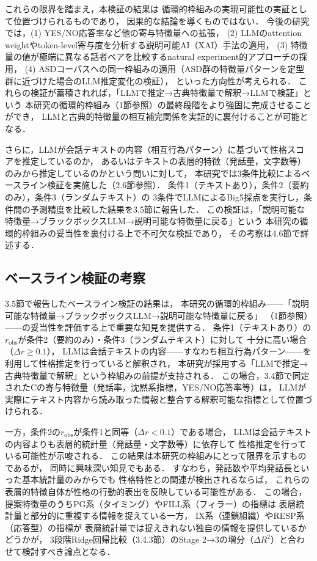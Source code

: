 \documentclass[dvipdfmx,11pt,a4paper]{bxjsarticle}
\renewcommand{\_}{\paperorigunderscore\allowbreak}%
\begin{document}
これらの限界を踏まえ，本検証の結果は
循環的枠組みの実現可能性の実証として位置づけられるものであり，
因果的な結論を導くものではない．
今後の研究では，(1) YES/NO応答率など他の寄与特徴量への拡張，
(2) LLMのattention weightやtoken-level寄与度を分析する説明可能AI（XAI）手法の適用，
(3) 特徴量の値が極端に異なる話者ペアを比較するnatural experiment的アプローチの採用，
(4) ASDコーパスへの同一枠組みの適用（ASD群の特徴量パターンを定型群に近づけた場合のLLM推定変化の検証），
といった方向性が考えられる．
これらの検証が蓄積されれば，「LLMで推定→古典特徴量で解釈→LLMで検証」という
本研究の循環的枠組み（1節参照）の最終段階をより強固に完成させることができ，
LLMと古典的特徴量の相互補完関係を実証的に裏付けることが可能となる．

さらに，LLMが会話テキストの内容（相互行為パターン）に基づいて性格スコアを推定しているのか，
あるいはテキストの表層的特徴（発話量，文字数等）のみから推定しているのかという問いに対して，
本研究では3条件比較によるベースライン検証を実施した（2.6節参照）．
条件1（テキストあり），条件2（要約のみ），条件3（ランダムテキスト）の
3条件でLLMによるBig5採点を実行し，条件間の予測精度を比較した結果を3.5節に報告した．
この検証は，「説明可能な特徴量→ブラックボックスLLM→説明可能な特徴量に戻る」という
本研究の循環的枠組みの妥当性を裏付ける上で不可欠な検証であり，
その考察は4.6節で詳述する．

\subsection{ベースライン検証の考察}
\label{sec:discuss_baseline}


3.5節で報告したベースライン検証の結果は，
本研究の循環的枠組み——「説明可能な特徴量→ブラックボックスLLM→説明可能な特徴量に戻る」
（1節参照）——の妥当性を評価する上で重要な知見を提供する．
条件1（テキストあり）の$r_{\text{obs}}$が条件2（要約のみ）・条件3（ランダムテキスト）に対して
十分に高い場合（$\Delta r \geq 0.1$），
LLMは会話テキストの内容——すなわち相互行為パターン——を利用して性格推定を行っていると解釈され，
本研究が採用する「LLMで推定→古典特徴量で解釈」という枠組みの前提が支持される．
この場合，3.4節で同定されたCの寄与特徴量（発話率，沈黙系指標，YES/NO応答率等）は，
LLMが実際にテキスト内容から読み取った情報と整合する解釈可能な指標として位置づけられる．

一方，条件2の$r_{\text{obs}}$が条件1と同等（$\Delta r < 0.1$）である場合，
LLMは会話テキストの内容よりも表層的統計量（発話量・文字数等）に依存して
性格推定を行っている可能性が示唆される．
この結果は本研究の枠組みにとって限界を示すものであるが，
同時に興味深い知見でもある．
すなわち，発話数や平均発話長といった基本統計量のみからでも
性格特性との関連が検出されるならば，
これらの表層的特徴自体が性格の行動的表出を反映している可能性がある．
この場合，提案特徴量のうちPG系（タイミング）やFILL系（フィラー）の指標は
表層統計量と部分的に重複する情報を捉えている一方，
IX系（連鎖組織）やRESP系（応答型）の指標が
表層統計量では捉えきれない独自の情報を提供しているかどうかが，
3段階Ridge回帰比較（3.4.3節）のStage 2→3の増分（$\Delta R^2$）と合わせて検討すべき論点となる．
\end{document}
